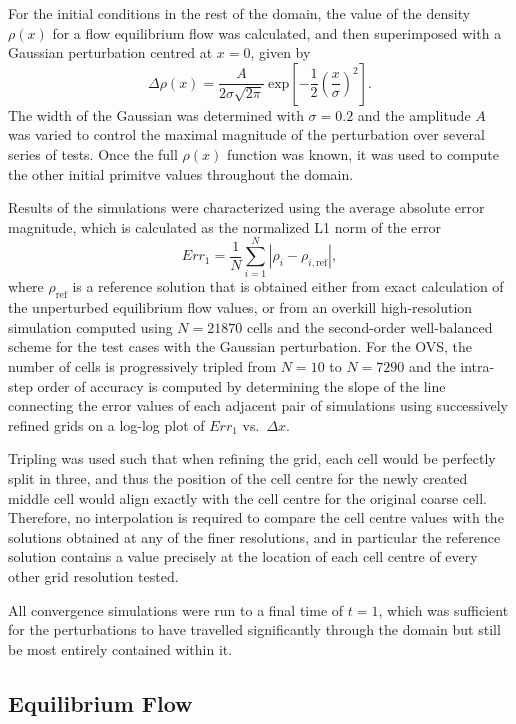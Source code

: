 For the initial conditions in the rest of the domain, the value of the density $\rho(x)$ for a flow equilibrium flow was calculated, and then superimposed with a Gaussian perturbation centred at $x=0$, given by
\begin{equation}
\Delta \rho(x)=\frac{A}{2\sigma \sqrt{2 \pi}}\ \textrm{exp}\left[-\frac{1}{2}\left(\frac{x}{\sigma}\right)^2\right].
\end{equation}
The width of the Gaussian was determined with $\sigma=0.2$ and the amplitude $A$ was varied to control the maximal magnitude of the perturbation over several series of tests. Once the full $\rho(x)$ function was known, it was used to compute the other initial primitve values throughout the domain.

Results of the simulations were characterized using the average absolute error magnitude, which is calculated as the normalized L1 norm of the error
\begin{equation}
Err_1=\frac{1}{N}\sum\limits_{i=1}^N \left|\rho_i-\rho_{i,\textrm{ref}}\right|,
\end{equation}
where $\rho_{\textrm{ref}}$ is a reference solution that is obtained either from exact calculation of the unperturbed equilibrium flow values, or from an overkill high-resolution simulation computed using $N=21870$ cells and the second-order well-balanced scheme for the test cases with the Gaussian perturbation. For the OVS, the number of cells is progressively tripled from $N=10$ to $N=7290$ and the intra-step order of accuracy is computed by determining the slope of the line connecting the error values of each adjacent pair of simulations using successively refined grids on a log-log plot of $Err_1$ vs.\ $\Delta x$.

Tripling was used such that when refining the grid, each cell would be perfectly split in three, and thus the position of the cell centre for the newly created middle cell would align exactly with the cell centre for the original coarse cell. Therefore, no interpolation is required to compare the cell centre values with the solutions obtained at any of the finer resolutions, and in particular the reference solution contains a value precisely at the location of each cell centre of every other grid resolution tested.

All convergence simulations were run to a final time of $t=1$, which was sufficient for the perturbations to have travelled significantly through the domain but still be most entirely contained within it.

\subsection{Equilibrium Flow}

